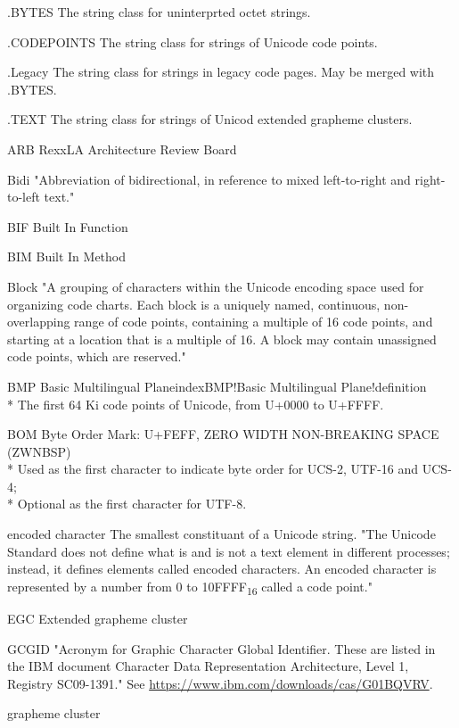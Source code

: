 \documentclass[b4paper]{article}
\begin{document}
\begin{definition}
\item [.BYTES] The string class for uninterprted octet strings.
\item [.CODEPOINTS] The string class for strings of Unicode code points.
\item [.Legacy] The string class for strings in legacy code pages.
May be merged with .BYTES.
\item [.TEXT] The string class for strings of Unicod extended grapheme clusters.
\item[ARB] RexxLA Architecture Review Board
\item [Bidi] "Abbreviation of bidirectional, in reference to mixed left-to-right and right-to-left text."
\item [BIF] Built In Function
\item [BIM] Built In Method
\item [Block] "A grouping of characters within the Unicode encoding
space used for organizing code charts. Each block is a uniquely named,
continuous, non-overlapping range of code points, containing a
multiple of 16 code points, and starting at a location that is a
multiple of 16. A block may contain unassigned code points, which are
reserved."
\item [BMP] Basic Multilingual Planeindex{BMP!Basic Multilingual Plane!definition}
\\*
The first 64 Ki code points of Unicode, from U+0000 to U+FFFF.
\item [BOM] Byte Order Mark: U+FEFF, ZERO WIDTH NON-BREAKING SPACE (ZWNBSP)
\\*
Used as the first character to indicate byte order for UCS-2, UTF-16 and UCS-4;
\\*
Optional as the first character for UTF-8.
\item [encoded character] The smallest constituant of a Unicode string.
"The Unicode Standard does not define what is and is not a text
element in different processes; instead, it defines elements called
encoded characters. An encoded character is represented by a number
from 0 to 10FFFF\textsubscript{16} called a code point."
\item [EGC] Extended grapheme cluster
\item [GCGID] "Acronym for Graphic Character Global Identifier.
These are listed in the IBM document
Character Data Representation Architecture, Level 1, Registry SC09-1391."
See \url{https://www.ibm.com/downloads/cas/G01BQVRV}.
\item [grapheme cluster]

\end{definition}
\end{document}
